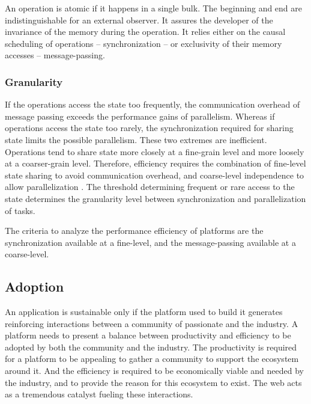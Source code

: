 An operation is atomic if it happens in a single bulk.
The beginning and end are indistinguishable for an external observer.
It assures the developer of the invariance of the memory during the operation.
It relies either on the causal scheduling of operations -- synchronization -- or exclusivity of their memory accesses -- message-passing.

\subsubsection{Granularity} \label{chapter3:definitions:efficiency:granularity}

If the operations access the state too frequently, the communication overhead of message passing exceeds the performance gains of parallelism.
Whereas if operations access the state too rarely, the synchronization required for sharing state limits the possible parallelism.
These two extremes are inefficient.
Operations tend to share state more closely at a fine-grain level and more loosely at a coarser-grain level.
Therefore, efficiency requires the combination of fine-level state sharing to avoid communication overhead, and coarse-level independence to allow parallelization \cite{Gustafson1988,Gunther1996,Nelson1996,Gunther2002}.
The threshold determining frequent or rare access to the state determines the granularity level between synchronization and parallelization of tasks.

\separator

The criteria to analyze the performance efficiency of platforms are the synchronization available at a fine-level, and the message-passing available at a coarse-level.


\subsection{Adoption} \label{chapter3:definitions:adoption}

An application is sustainable only if the platform used to build it generates reinforcing interactions between a community of passionate and the industry.
A platform needs to present a balance between productivity and efficiency to be adopted by both the community and the industry.
The productivity is required for a platform to be appealing to gather a community to support the ecosystem around it.
And the efficiency is required to be economically viable and needed by the industry, and to provide the reason for this ecosystem to exist.
The web acts as a tremendous catalyst fueling these interactions.

